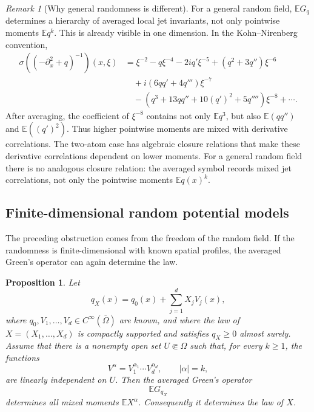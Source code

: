 \documentclass[11pt]{article}
\newcommand{\OmegaD}{\Omega}
\newcommand{\E}{\mathbb E}
\theoremstyle{plain}
\newtheorem{proposition}[theorem]{Proposition}
\theoremstyle{definition}
\theoremstyle{remark}
\newtheorem{remark}[theorem]{Remark}
\begin{document}
\begin{remark}[Why general randomness is different]\label{rem:general-random-obstruction}
For a general random field, $\E G_q$ determines a hierarchy of averaged local jet invariants, not only pointwise moments $\E q^k$.  This is already visible in one dimension.  In the Kohn--Nirenberg convention,
\begin{align*}
 \sigma(( -\partial_x^2+q)^{-1})(x,\xi)
 & =\xi^{-2}-q\xi^{-4}-2iq'\xi^{-5}
 +(q^2+3q'')\xi^{-6} \\
 &\quad +i(6qq'+4q''')\xi^{-7} \\
 &\quad -(q^3+13qq''+10(q')^2+5q'''')\xi^{-8}+\cdots.
\end{align*}
After averaging, the coefficient of $\xi^{-8}$ contains not only $\E q^3$, but also $\E(qq'')$ and $\E((q')^2)$.  Thus higher pointwise moments are mixed with derivative correlations.  The two-atom case has algebraic closure relations that make these derivative correlations dependent on lower moments.  For a general random field there is no analogous closure relation: the averaged symbol records mixed jet correlations, not only the pointwise moments $\E q(x)^k$.
\end{remark}

\subsection{Finite-dimensional random potential models}

The preceding obstruction comes from the freedom of the random field.  If the randomness is finite-dimensional with known spatial profiles, the averaged Green's operator can again determine the law.

\begin{proposition}\label{prop:finite-dimensional-Green-model}
Let
\[
  q_X(x)=q_0(x)+\sum_{j=1}^d X_jV_j(x),
\]
where $q_0,V_1,\dots,V_d\in C^\infty(\overline\OmegaD)$ are known, and where the law of $X=(X_1,\dots,X_d)$ is compactly supported and satisfies $q_X\ge0$ almost surely.  Assume that there is a nonempty open set $U\Subset\OmegaD$ such that, for every $k\ge1$, the functions
\[
  V^\alpha=V_1^{\alpha_1}\cdots V_d^{\alpha_d},
  \qquad |\alpha|=k,
\]
are linearly independent on $U$.  Then the averaged Green's operator
\[
  \E G_{q_X}
\]
determines all mixed moments $\E X^\alpha$.  Consequently it determines the law of $X$.
\end{proposition}
\end{document}
